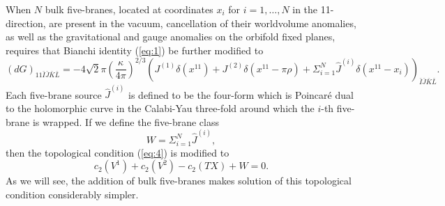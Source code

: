 \documentclass[a4paper,12pt]{article}
\numberwithin{equation}{section}
\theoremstyle{plain}
\begin{document}
When $N$ bulk five-branes, located at coordinates $x_{i}$ for $i=1,\dots,N$
in the 11-direction, are present in the vacuum, cancellation of their
worldvolume anomalies, as well as the gravitational and gauge anomalies 
on the orbifold fixed planes, requires that Bianchi identity (\ref{eq:1}) be  
further modified to
%
\begin{equation}
(dG)_{11\bar{I}\bar{J}\bar{K}\bar{L}}=-4\sqrt{2}\pi\left(\frac{\kappa}
{4\pi}\right)^{2/3}(J^{(1)}\delta(x^{11}) + J^{(2)}\delta(x^{11}-\pi\rho)
+\Sigma_{i=1}^{N} \hat{J}^{(i)}\delta(x^{11}-x_{i}))_{\bar{I}
\bar{J}\bar{K}\bar{L}}.
\label{eq:27}
\end{equation}
%
Each five-brane source $\hat{J}^{(i)}$ is defined to be the four-form which is 
Poincar\'e dual to the holomorphic curve in the Calabi-Yau three-fold 
around which the $i$-th five-brane is wrapped. If we define the five-brane class 
%
\begin{equation}
W=\Sigma_{i=1}^{N} \hat{J}^{(i)},
\label{eq:28}
\end{equation}
%
then the topological condition (\ref{eq:4}) is modified to
%
\begin{equation}
c_{2}(V^{1})+c_{2}(V^{2})-c_{2}(TX)+W=0.
\label{eq:29}
\end{equation}
%
As we will see, the addition of bulk five-branes makes solution of this
topological condition considerably simpler.
\end{document}

